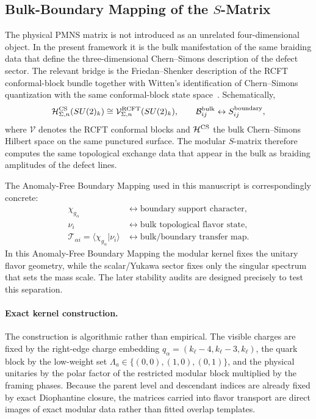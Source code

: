 \documentclass[11pt]{article}
\begin{document}
\subsection{Bulk-Boundary Mapping of the $S$-Matrix}

The physical PMNS matrix is not introduced as an unrelated four-dimensional object. In the present framework it is the bulk manifestation of the same braiding data that define the three-dimensional Chern--Simons description of the defect sector. The relevant bridge is the Friedan--Shenker description of the RCFT conformal-block bundle together with Witten's identification of Chern--Simons quantization with the same conformal-block state space~\cite{friedan1987,witten1989}. Schematically,
\begin{equation}
 \mathcal H^{\rm CS}_{\Sigma,n}(SU(2)_k)
 \cong
 \mathcal V^{\rm RCFT}_{\Sigma,n}(SU(2)_k),
 \qquad
 \mathcal B^{\rm bulk}_{ij} \leftrightarrow S^{\rm boundary}_{ij},
\end{equation}
where $\mathcal V$ denotes the RCFT conformal blocks and $\mathcal H^{\rm CS}$ the bulk Chern--Simons Hilbert space on the same punctured surface. The modular $S$-matrix therefore computes the same topological exchange data that appear in the bulk as braiding amplitudes of the defect lines.

The Anomaly-Free Boundary Mapping used in this manuscript is correspondingly concrete:
\begin{equation}
 \begin{aligned}
 \chi_{g_\alpha}
 &\leftrightarrow
 \text{boundary support character},\\
 \nu_i
 &\leftrightarrow
 \text{bulk topological flavor state},\\
 \mathcal T_{\alpha i}=\langle\chi_{g_\alpha}|\nu_i\rangle
 &\leftrightarrow
 \text{bulk/boundary transfer map}.
 \end{aligned}
\end{equation}
In this Anomaly-Free Boundary Mapping the modular kernel fixes the unitary flavor geometry, while the scalar/Yukawa sector fixes only the singular spectrum that sets the mass scale. The later stability audits are designed precisely to test this separation.

\paragraph{Exact kernel construction.}
The construction is algorithmic rather than empirical. The visible charges are fixed by the right-edge charge embedding $q_{\alpha}=(k_{\ell}-4,k_{\ell}-3,k_{\ell})$, the quark block by the low-weight set $\Lambda_a\in\{(0,0),(1,0),(0,1)\}$, and the physical unitaries by the polar factor of the restricted modular block multiplied by the framing phases. Because the parent level and descendant indices are already fixed by exact Diophantine closure, the matrices carried into flavor transport are direct images of exact modular data rather than fitted overlap templates.
\end{document}
